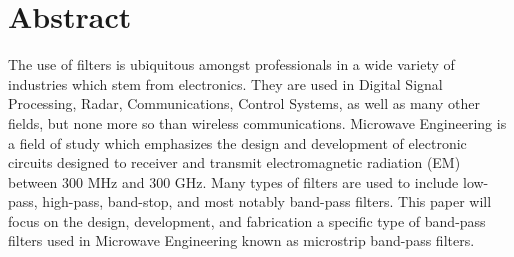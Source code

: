 \documentclass{article}
\begin{document}
\begin{titlepage}
    \maketitle
    \thispagestyle{empty}
    \newpage
\end{titlepage}

\tableofcontents
\listoftables
\listoffigures
\newpage

\section{Abstract}
The use of filters is ubiquitous amongst professionals in a wide variety of industries which stem from electronics. They are used in Digital Signal Processing, Radar, Communications, Control Systems, as well as many other fields, but none more so than wireless communications. Microwave Engineering is a field of study which emphasizes the design and development of electronic circuits designed to receiver and transmit electromagnetic radiation (EM) between 300 MHz and 300 GHz. Many types of filters are used to include low-pass, high-pass, band-stop, and most notably band-pass filters. This paper will focus on the design, development, and fabrication a specific type of band-pass filters used in Microwave Engineering known as microstrip band-pass filters.
\end{document}
